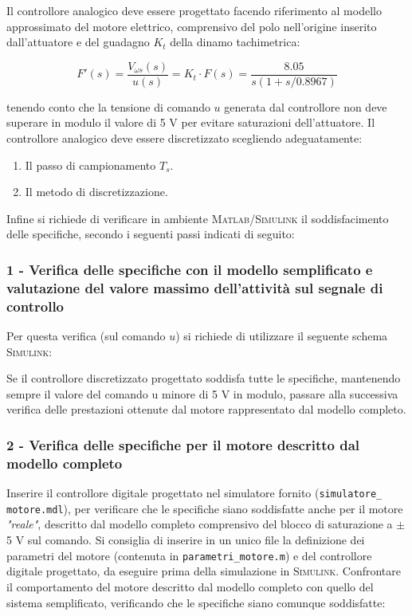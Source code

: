\documentclass[../main.tex]{subfiles}
\begin{document}

Il controllore analogico deve essere progettato facendo riferimento al modello approssimato del motore elettrico, comprensivo del polo nell’origine inserito dall’attuatore e del guadagno $K_t$ della dinamo tachimetrica:


\begin{equation}
	F'(s) = \frac{V_{\omega s}(s)}{u(s)} = K_t \cdot F(s) = \frac{8.05}{s(1 + s/0.8967)}
\end{equation}

tenendo conto che la tensione di comando $u$ generata dal controllore non deve superare in modulo il valore di 5 V per evitare saturazioni dell’attuatore.
Il controllore analogico deve essere discretizzato scegliendo adeguatamente:

\begin{enumerate}
	\item[\textbf{-}] Il passo di campionamento $T_s$.
	\item[\textbf{-}] Il metodo di discretizzazione.
\end{enumerate}

Infine si richiede di verificare in ambiente \textsc{Matlab}/\textsc{Simulink} il soddisfacimento delle specifiche, secondo i seguenti passi indicati di seguito:


\subsubsection*{1 - Verifica delle specifiche con il modello semplificato e valutazione del valore massimo dell’attività sul segnale di controllo}

Per questa verifica (sul comando $u$) si richiede di utilizzare il seguente schema \textsc{Simulink}:


Se il controllore discretizzato progettato soddisfa tutte le specifiche, mantenendo sempre il valore del comando u minore di 5 V in modulo, passare alla successiva verifica delle prestazioni ottenute dal motore rappresentato dal modello completo.

\subsubsection*{2 - Verifica delle specifiche per il motore descritto dal modello completo}


Inserire il controllore digitale progettato nel simulatore fornito (\texttt{simulatore\_ motore.mdl}), per verificare che le specifiche siano soddisfatte anche per il motore \textit{"reale"}, descritto dal modello completo comprensivo del blocco di saturazione a $\pm$5 V sul comando. Si consiglia di inserire in un unico file la definizione dei parametri del motore (contenuta in \texttt{parametri\_motore.m}) e del controllore digitale progettato, da eseguire prima della simulazione in \textsc{Simulink}. Confrontare il comportamento del motore descritto dal modello completo con quello del sistema semplificato, verificando che le specifiche siano comunque soddisfatte:
\end{document}
